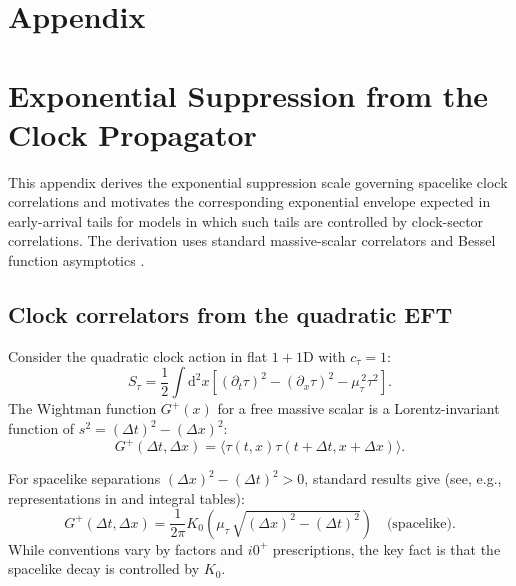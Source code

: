 \documentclass[pdflatex,sn-mathphys-num]{sn-jnl}
\theoremstyle{thmstylethree}
\theoremstyle{thmstyleone}
\theoremstyle{thmstyletwo}
\numberwithin{equation}{section}
\newcommand{\dd}{\mathrm{d}}
\newcommand{\Gplus}{G^{+}}
\newcommand{\Kzero}{K_{0}}
\begin{document}
        \appendix
    \section*{Appendix}
    \section{Exponential Suppression from the Clock Propagator}
    \label{app:prop}
    
    This appendix derives the exponential suppression scale governing spacelike clock correlations and motivates the corresponding exponential envelope expected in early-arrival tails for models in which such tails are controlled by clock-sector correlations. The derivation uses standard massive-scalar correlators and Bessel function asymptotics \cite{Peskin1995,Weinberg1995,GradshteynRyzhik}.
    
    \subsection{Clock correlators from the quadratic EFT}
        
        Consider the quadratic clock action in flat $1+1$D with $c_\tau=1$:
        \begin{equation}
            S_\tau=\frac12\int \dd^2x\left[(\partial_t\tau)^2-(\partial_x\tau)^2-\mu_{\tau}^{\,2}\tau^2\right].
        \end{equation}
        The Wightman function $\Gplus(x)$ for a free massive scalar is a Lorentz-invariant function of $s^2=(\Delta t)^2-(\Delta x)^2$:
        \begin{equation}
            \Gplus(\Delta t,\Delta x)=\langle \tau(t,x)\tau(t+\Delta t,x+\Delta x)\rangle.
        \end{equation}
        
        For spacelike separations $(\Delta x)^2-(\Delta t)^2>0$, standard results give (see, e.g., representations in \cite{Weinberg1995} and integral tables):
        \begin{equation}
            \Gplus(\Delta t,\Delta x)
            =\frac{1}{2\pi}\Kzero\!\left(\mu_\tau\,\sqrt{(\Delta x)^2-(\Delta t)^2}\right)
            \quad\text{(spacelike)}.
            \label{eq:WightmanK0}
        \end{equation}
        While conventions vary by factors and $i0^+$ prescriptions, the key fact is that the spacelike decay is controlled by $\Kzero$.
    
\end{document}
